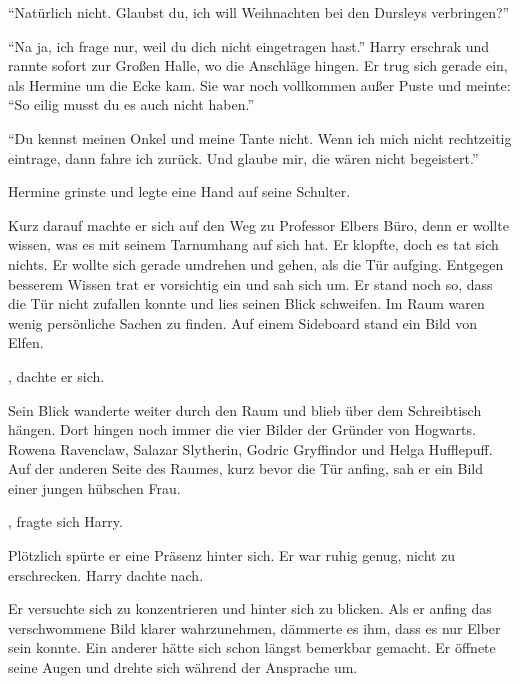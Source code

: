 \enquote{Natürlich nicht. Glaubst du, ich will Weihnachten bei den Dursleys verbringen?}

\enquote{Na ja, ich frage nur, weil du dich nicht eingetragen hast.} Harry erschrak und rannte sofort zur Großen Halle, wo die Anschläge hingen. Er trug sich gerade ein, als Hermine um die Ecke kam. Sie war noch vollkommen außer Puste und meinte: \enquote{So eilig musst du es auch nicht haben.}

\enquote{Du kennst meinen Onkel und meine Tante nicht. Wenn ich mich nicht rechtzeitig eintrage, dann fahre ich zurück. Und glaube mir, die wären nicht begeistert.}

Hermine grinste und legte eine Hand auf seine Schulter.

Kurz darauf machte er sich auf den Weg zu Professor Elbers Büro, denn er wollte wissen, was es mit seinem Tarnumhang auf sich hat. Er klopfte, doch es tat sich nichts. Er wollte sich gerade umdrehen und gehen, als die Tür aufging. Entgegen besserem Wissen trat er vorsichtig ein und sah sich um. Er stand noch so, dass die Tür nicht zufallen konnte und lies seinen Blick schweifen. Im Raum waren wenig persönliche Sachen zu finden. Auf einem Sideboard stand ein Bild von Elfen.

, dachte er sich. 

Sein Blick wanderte weiter durch den Raum und blieb über dem Schreibtisch hängen. Dort hingen noch immer die vier Bilder der Gründer von Hogwarts. Rowena Ravenclaw, Salazar Slytherin, Godric Gryffindor und Helga Hufflepuff. Auf der anderen Seite des Raumes, kurz bevor die Tür anfing, sah er ein Bild einer jungen hübschen Frau.

, fragte sich Harry.

Plötzlich spürte er eine Präsenz hinter sich. Er war ruhig genug, nicht zu erschrecken.  Harry dachte nach.

Er versuchte sich zu konzentrieren und hinter sich zu blicken. Als er anfing das verschwommene Bild klarer wahrzunehmen, dämmerte es ihm, dass es nur Elber sein konnte. Ein anderer hätte sich schon längst bemerkbar gemacht. Er öffnete seine Augen und drehte sich während der Ansprache um.

